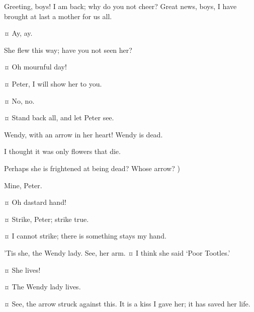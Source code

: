 \begin{drama}

\peterspeaks
Greeting, boys!
I am back; why do you not cheer?
Great news, boys, I have brought at last a mother for us all.

\slightlyspeaks {}¤
Ay, ay.

\peterspeaks
She flew this way; have you not seen her?

\secondtwinspeaks {}¤
Oh mournful day!

\tootlesspeaks {}¤
Peter, I will show her to you.

 ¤
No, no.

\tootlesspeaks {}¤
Stand back all, and let Peter see.


\peterspeaks
Wendy, with an arrow in her heart!
Wendy is dead.

\curlyspeaks
I thought it was only flowers that die.

\peterspeaks
Perhaps she is frightened at being dead?
Whose arrow?
)

\tootlesspeaks
Mine, Peter.

\peterspeaks {}¤
Oh dastard hand!

\tootlesspeaks {}¤
Strike, Peter; strike true.

\peterspeaks {}¤
I cannot strike; there is something stays my hand.


\nibsspeaks
’Tis she, the Wendy lady.
See, her arm.
¤
I think she said ‘Poor Tootles.'

\peterspeaks {}¤
She lives!

\slightlyspeaks {}¤
The Wendy lady lives.

\peterspeaks {}¤
See, the arrow struck against this.
It is a kiss I gave her; it has saved her life.


\end{drama}
